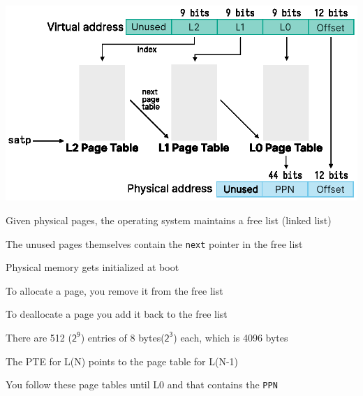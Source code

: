 \begin{slide}


    \centering
    \includegraphics{multi-level-page-table.eps} 

\end{slide}

\begin{slide}


    Given physical pages, the operating system maintains a free list (linked
    list)
    \medskip

    The unused pages themselves contain the \texttt{next} pointer in the free list

    \leftspace{}Physical memory gets initialized at boot
    \medskip

    To allocate a page, you remove it from the free list

    \leftspace{}To deallocate a page you add it back to the free list

\end{slide}

\begin{slide}


    There are 512 ($\mathsf{2^9}$) entries of 8 bytes($\mathsf{2^3}$) each,
    which is 4096 bytes
    \medskip

    The PTE for L(N) points to the page table for L(N-1)
    \medskip

    You follow these page tables until L0 and that contains the \texttt{PPN}

\end{slide}

